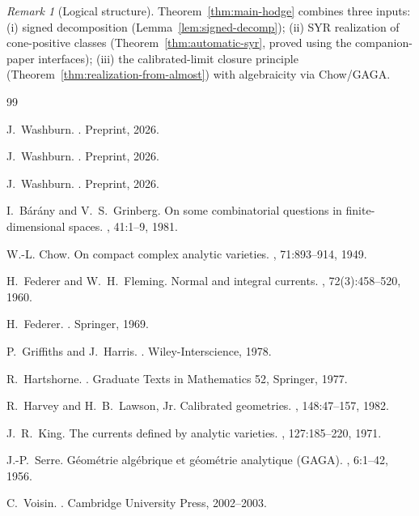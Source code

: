 \documentclass[11pt]{article}
\numberwithin{equation}{section}
\theoremstyle{plain}
\theoremstyle{definition}
\theoremstyle{remark}
\newtheorem{remark}[theorem]{Remark}
\begin{document}
\begin{remark}[Logical structure]
\label{rem:hodge-final-remark}
Theorem~\ref{thm:main-hodge} combines three inputs:
(i) signed decomposition (Lemma~\ref{lem:signed-decomp});
(ii) SYR realization of cone-positive classes
(Theorem~\ref{thm:automatic-syr}, proved using the companion-paper
interfaces);
(iii) the calibrated-limit closure principle
(Theorem~\ref{thm:realization-from-almost}) with algebraicity via
Chow/GAGA.
\end{remark}


\begin{thebibliography}{99}

J.~Washburn.
.
\newblock Preprint, 2026.

J.~Washburn.
.
\newblock Preprint, 2026.

J.~Washburn.
.
\newblock Preprint, 2026.

I.~B\'ar\'any and V.~S.~Grinberg.
\newblock On some combinatorial questions in finite-dimensional spaces.
, 41:1--9, 1981.

W.-L. Chow.
\newblock On compact complex analytic varieties.
, 71:893--914, 1949.

H.~Federer and W.~H.~Fleming.
\newblock Normal and integral currents.
, 72(3):458--520, 1960.

H.~Federer.
.
\newblock Springer, 1969.

P.~Griffiths and J.~Harris.
.
\newblock Wiley-Interscience, 1978.

R.~Hartshorne.
.
\newblock Graduate Texts in Mathematics 52, Springer, 1977.

R.~Harvey and H.~B.~Lawson, Jr.
\newblock Calibrated geometries.
, 148:47--157, 1982.

J.~R.~King.
\newblock The currents defined by analytic varieties.
, 127:185--220, 1971.

J.-P.~Serre.
\newblock G\'eom\'etrie alg\'ebrique et g\'eom\'etrie analytique (GAGA).
, 6:1--42, 1956.

C.~Voisin.
.
\newblock Cambridge University Press, 2002--2003.

\end{thebibliography}
\end{document}
